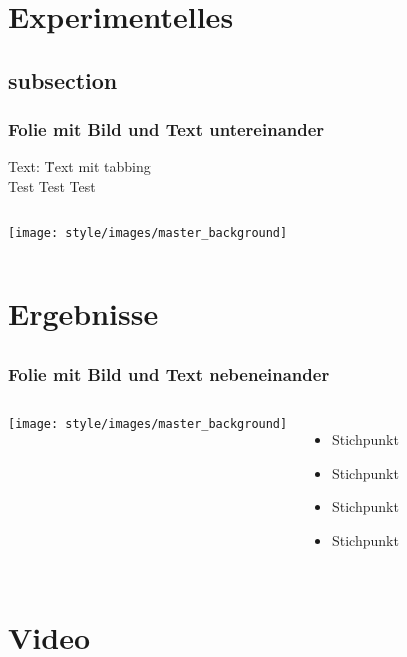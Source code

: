 \section{Experimentelles}
\subsection{subsection}
\begin{frame}
\frametitle{Folie mit Bild und Text untereinander}
\begin{tabbing}
	Text: \qquad \= Text mit tabbing\\
	\> Test Test Test\\
\end{tabbing}
	\vskip5mm
	\begin{columns}
		\column{12cm}
		\centering
		\texttt{[image: style/images/master\_background]}\\
	\end{columns}
\end{frame}

\section{Ergebnisse}
\subsection*{}
\begin{frame}
\frametitle{Folie mit Bild und Text nebeneinander}
	\begin{columns}
		\column{6cm}
		\vskip5mm
		\texttt{[image: style/images/master\_background]}\\
		\vskip5mm
    	\column{5cm}

		\begin{itemize}
		 \itemsep1.2em
		 \item Stichpunkt
      	 \item Stichpunkt
       	 \item Stichpunkt
     	 \item Stichpunkt
		\end{itemize}
	\end{columns}
\end{frame}


\section{Video}

